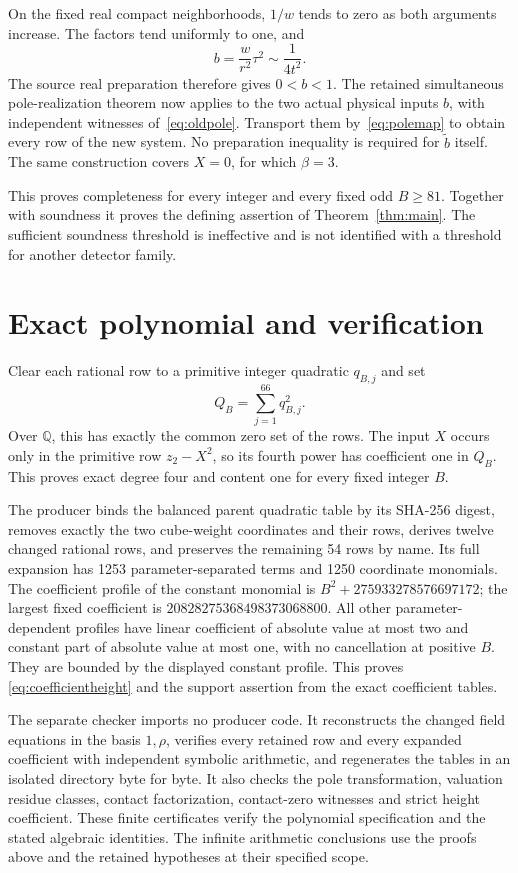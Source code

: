 \documentclass[11pt,a4paper]{article}
\theoremstyle{remark}\newtheorem{remark}[theorem]{Remark}
\newcommand{\Q}{\mathbb Q}\newcommand{\Z}{\mathbb Z}
\begin{document}
On the fixed real compact neighborhoods, $1/w$ tends to zero as both
arguments increase. The factors tend uniformly to one, and
\[
                 b=\frac{w}{r^2}\tau^2\sim\frac1{4t^2}.
\]
The source real preparation therefore gives $0<b<1$. The retained
simultaneous pole-realization theorem now applies to the two actual
physical inputs $b$, with independent witnesses of~\eqref{eq:oldpole}.
Transport them by~\eqref{eq:polemap} to obtain every row of the new
system. No preparation inequality is required for $\widetilde b$ itself.
The same construction covers $X=0$, for which $\beta=3$.

This proves completeness for every integer and every fixed odd $B\ge81$.
Together with soundness it proves the defining assertion of
Theorem~\ref{thm:main}. The sufficient soundness threshold is ineffective
and is not identified with a threshold for another detector family.

\section{Exact polynomial and verification}
Clear each rational row to a primitive integer quadratic $q_{B,j}$ and set
\[
                         Q_B=\sum_{j=1}^{66}q_{B,j}^2.
\]
Over $\Q$, this has exactly the common zero set of the rows. The input
$X$ occurs only in the primitive row $z_2-X^2$, so its fourth power
has coefficient one in $Q_B$. This proves exact degree four and content
one for every fixed integer $B$.

The producer binds the balanced parent quadratic table by its SHA-256
digest, removes exactly the two cube-weight coordinates and their rows,
derives twelve changed rational rows, and preserves the remaining
54 rows by name. Its full expansion has 1253 parameter-separated terms
and 1250 coordinate monomials. The coefficient profile of the constant
monomial is $B^2+275933278576697172$; the largest fixed coefficient is
$20828275368498373068800$. All other parameter-dependent profiles have
linear coefficient of absolute value at most two and constant part of
absolute value at most one, with no cancellation at positive $B$.
They are bounded by the displayed constant profile. This proves
\eqref{eq:coefficientheight} and the support assertion from the exact
coefficient tables.

The separate checker imports no producer code. It reconstructs the
changed field equations in the basis $1,\rho$, verifies every retained
row and every expanded coefficient with independent symbolic arithmetic,
and regenerates the tables in an isolated directory byte for byte.
It also checks the pole transformation, valuation residue classes,
contact factorization, contact-zero witnesses and strict height coefficient.
These finite certificates verify the polynomial specification and the stated
algebraic identities. The infinite arithmetic conclusions use the proofs
above and the retained hypotheses at their specified scope.
\end{document}

